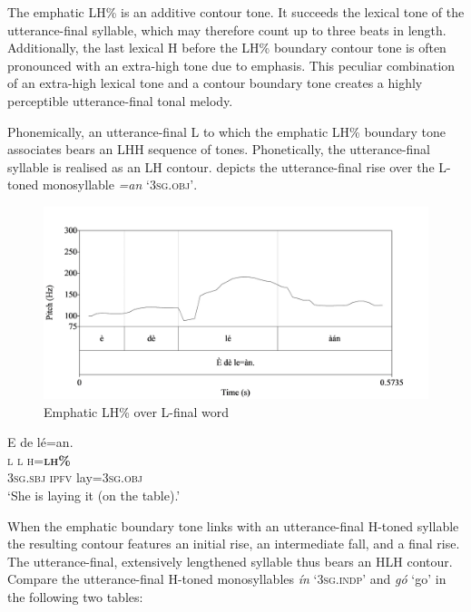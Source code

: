 The emphatic LH\% is an additive contour tone. It succeeds the  lexical tone of the utterance-final syllable, which may therefore count up to three beats in length. Additionally, the last lexical H before the LH\% boundary contour tone is often pronounced with an extra-high tone due to emphasis. This peculiar combination of an extra-high lexical tone and a contour boundary tone creates a highly perceptible utterance-final tonal melody. 



Phonemically, an utterance-final L to which the emphatic LH\% boundary tone associates bears an LHH sequence of tones. Phonetically, the utterance-final syllable is realised as an LH contour.  depicts the utterance-final rise over the L-toned monosyllable \textit{=an} ‘\textsc{3sg.obj’}. 


\begin{figure}
\caption{Emphatic LH\% over L-final word}
\label{fig:key:3.30}
\includegraphics[height=.3\textheight]{figures/yakpomod-img32.png}
\end{figure}

  
 


\ea%
    \label{ex:key:83}
    \gll   E    de  lé=an.\\
\textsc{l}    \textsc{l}  \textsc{h=}\textbf{\textsc{lh\%}}\\
\textsc{3sg.sbj}  \textsc{ipfv}    lay=\textsc{3sg.obj}\\
\glt ‘She is laying it (on the table).’
\z

When the emphatic boundary tone links with an utterance-final H-toned syllable the resulting contour features an initial rise, an intermediate fall, and a final rise. The utterance-final, extensively lengthened syllable thus bears an HLH contour. Compare the utterance-final H-toned monosyllables \textit{ín} ‘\textsc{3sg.indp}’ and \textit{gó} ‘go’ in the following two tables: 

